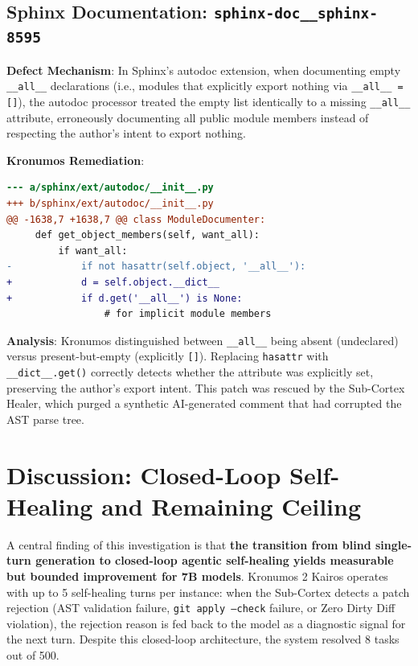 \documentclass[10pt,twocolumn,letterpaper]{article}
\begin{document}
\subsection{Sphinx Documentation: \texttt{sphinx-doc\_\_sphinx-8595}}
\textbf{Defect Mechanism}: In Sphinx's autodoc extension, when documenting empty \texttt{\_\_all\_\_} declarations (i.e., modules that explicitly export nothing via \texttt{\_\_all\_\_ = []}), the autodoc processor treated the empty list identically to a missing \texttt{\_\_all\_\_} attribute, erroneously documenting all public module members instead of respecting the author's intent to export nothing.

\textbf{Kronumos Remediation}:
\begin{lstlisting}[language=diff]
--- a/sphinx/ext/autodoc/__init__.py
+++ b/sphinx/ext/autodoc/__init__.py
@@ -1638,7 +1638,7 @@ class ModuleDocumenter:
     def get_object_members(self, want_all):
         if want_all:
-            if not hasattr(self.object, '__all__'):
+            d = self.object.__dict__
+            if d.get('__all__') is None:
                 # for implicit module members
\end{lstlisting}
\textbf{Analysis}: Kronumos distinguished between \texttt{\_\_all\_\_} being absent (undeclared) versus present-but-empty (explicitly \texttt{[]}). Replacing \texttt{hasattr} with \texttt{\_\_dict\_\_.get()} correctly detects whether the attribute was explicitly set, preserving the author's export intent. This patch was rescued by the Sub-Cortex Healer, which purged a synthetic AI-generated comment that had corrupted the AST parse tree.

\section{Discussion: Closed-Loop Self-Healing and Remaining Ceiling}

A central finding of this investigation is that \textbf{the transition from blind single-turn generation to closed-loop agentic self-healing yields measurable but bounded improvement for 7B models}. Kronumos 2 Kairos operates with up to 5 self-healing turns per instance: when the Sub-Cortex detects a patch rejection (AST validation failure, \texttt{git apply --check} failure, or Zero Dirty Diff violation), the rejection reason is fed back to the model as a diagnostic signal for the next turn. Despite this closed-loop architecture, the system resolved 8 tasks out of 500.
\end{document}
